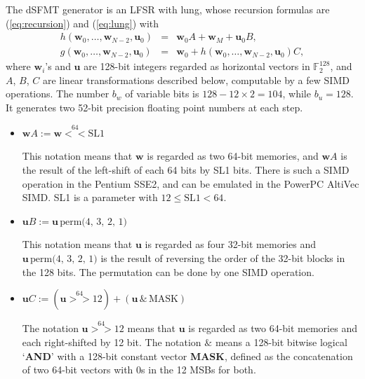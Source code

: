 \documentclass{svmult}
\begin{document}
The dSFMT generator is an LFSR with lung, whose recursion formulas are
(\ref{eq:recursion}) and (\ref{eq:lung}) with
\begin{eqnarray}
  h(\mathbf{w}_0, \ldots , \mathbf{w}_{N-2}, \mathbf{u}_0)
  &=& \mathbf{w}_{0}A + \mathbf{w}_{M} + \mathbf{u}_{0}B, \label{eq:dsfmt}
  \\
  g(\mathbf{w}_0, \ldots , \mathbf{w}_{N-2}, \mathbf{u}_0)
  &=& \mathbf{w}_{0}
  + h(\mathbf{w}_0, \ldots , \mathbf{w}_{N-2}, \mathbf{u}_0)C, \label{eq:dsfmt-lung}
\end{eqnarray}
where $\mathbf{w}_i$'s and $\mathbf{u}$ are
128-bit integers regarded as horizontal vectors
in ${\mathbb F}_2^{128}$, and $A$, $B$, $C$ are linear transformations
described below,
computable by a few SIMD operations. The number $b_w$ of variable bits
is $128-12\times 2=104$, while $b_u=128$. It generates two 52-bit
precision floating point numbers at each step.
\begin{itemize}
\item
  $\mathbf{w} A := \mathbf{w} \stackrel{64}{<<} \textrm{SL1}$

  This notation means that $\mathbf{w}$ is regarded as two
  64-bit memories, and $\mathbf{w} A$ is the result of the left-shift
  of each 64 bits by SL1 bits. There is such a SIMD operation in
  the Pentium SSE2, and can be emulated in the PowerPC AltiVec SIMD.
  SL1 is a parameter with $12 \le \textrm{SL1} < 64$.

\item
  $\mathbf{u} B := \mathbf{u}\,\textrm{perm(4, 3, 2, 1)}$

  This notation means that $\mathbf{u}$ is regarded as four
  32-bit memories and $\mathbf{u}\,\textrm{perm(4, 3, 2, 1)}$ is
  the result of reversing the order of the 32-bit blocks in the 128 bits.
  The permutation can be done by one SIMD operation.

\item
  $\mathbf{u} C := (\mathbf{u} \stackrel{64}{>>} 12)
  + (\mathbf{u}\, \& \,\textrm{MASK})$

  The notation $\mathbf{u} \stackrel{64}{>>} 12$ means that
  $\mathbf{u}$ is regarded as two 64-bit memories and each
  right-shifted by 12 bit.  The notation $\&$ means a 128-bit
  bitwise logical `\textbf{AND}' with a 128-bit constant vector \textbf{MASK},
  defined as the concatenation of two 64-bit vectors with 0s in the 12 MSBs
  for both.

\end{itemize}
\end{document}
